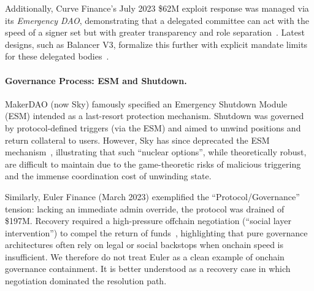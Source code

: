 \documentclass[12pt]{article}
\begin{document}
Additionally, Curve Finance's July 2023 \$62M exploit response was managed via its \emph{Emergency DAO}, demonstrating that a delegated committee can act with the speed of a signer set but with greater transparency and role separation~\cite{CurveExploitLlamaRisk}. Latest designs, such as Balancer V3, formalize this further with explicit mandate limits for these delegated bodies~\cite{BalancerV3EmergencySubDAO}.

\paragraph{Governance Process: ESM and Shutdown.}
MakerDAO (now Sky) famously specified an Emergency Shutdown Module (ESM) intended as a last-resort protection mechanism. Shutdown was governed by protocol-defined triggers (via the ESM) and aimed to unwind positions and return collateral to users. However, Sky has since deprecated the ESM mechanism~\cite{MakerDAOEmergencyShutdown}, illustrating that such ``nuclear options'', while theoretically robust, are difficult to maintain due to the game-theoretic risks of malicious triggering and the immense coordination cost of unwinding state.

Similarly, Euler Finance (March 2023) exemplified the ``Protocol/Governance'' tension: lacking an immediate admin override, the protocol was drained of \$197M. Recovery required a high-pressure offchain negotiation (``social layer intervention'') to compel the return of funds~\cite{Euler2023Exploit}, highlighting that pure governance architectures often rely on legal or social backstops when onchain speed is insufficient. We therefore do not treat Euler as a clean example of onchain governance containment. It is better understood as a recovery case in which negotiation dominated the resolution path.
\end{document}
